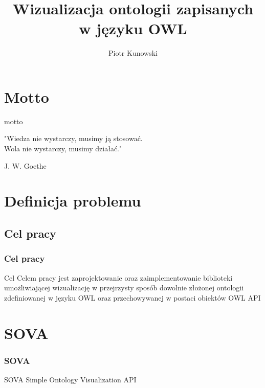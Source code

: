 \documentclass{beamer}
\title{Wizualizacja ontologii zapisanych w języku OWL}
\author{Piotr Kunowski}
\begin{document}
\def\protege{Prot\'{e}g\'{e}}
\begin{frame}
  \titlepage
\end{frame}

\section{Motto}
\begin{frame}
\begin{block}{motto} 

"Wiedza nie wystarczy, musimy ją stosować. \\
Wola nie wystarczy, musimy działać."
\begin{flushright}
J. W. Goethe
\end{flushright}
\end{block}
 

\end{frame}


\section{Definicja problemu}

\subsection{Cel pracy}

\begin{frame}
  \frametitle{Cel pracy}
  \begin{block}{Cel}
	Celem pracy jest zaprojektowanie oraz zaimplementowanie biblioteki umożliwiającej wizualizację w przejrzysty 
sposób dowolnie złożonej ontologii zdefiniowanej w języku OWL oraz przechowywanej w postaci obiektów OWL API
  \end{block}
\end{frame}

\section{SOVA}
\begin{frame}
	\frametitle{SOVA}
	 \begin{block}{SOVA}
		Simple Ontology Visualization API
	\end{block} 
\end{frame}
\end{document}
